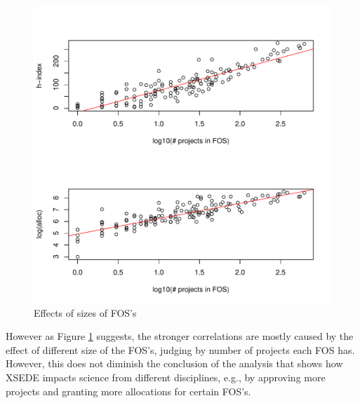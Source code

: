 \documentclass{tex/sig-alternate}
\begin{document}
\begin{figure}[!htb] 
  \centering 
    \includegraphics[width=1.0\columnwidth]{images/05_hindexalloc_vs_nprojects_fos_trended.pdf} 
  \caption{Effects of sizes of FOS's}\label{F:hindexalloc-vs-nprojects-fos-trended} 
\end{figure} 
 
However as Figure \ref{F:hindexalloc-vs-nprojects-fos-trended} suggests, the stronger correlations are mostly caused by the effect of different size of the FOS's, judging by number of projects each FOS has. However, this does not diminish the conclusion of the analysis that shows how XSEDE impacts science from different disciplines, e.g., by approving more projects and granting more allocations for certain FOS's. 
 
\end{document}
